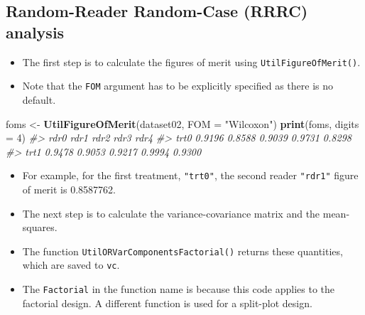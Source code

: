 \documentclass[
]{book}
\newenvironment{Shaded}{\begin{snugshade}}{\end{snugshade}}
\newcommand{\CommentTok}[1]{\textcolor[rgb]{0.56,0.35,0.01}{\textit{#1}}}
\newcommand{\DataTypeTok}[1]{\textcolor[rgb]{0.13,0.29,0.53}{#1}}
\newcommand{\DecValTok}[1]{\textcolor[rgb]{0.00,0.00,0.81}{#1}}
\newcommand{\KeywordTok}[1]{\textcolor[rgb]{0.13,0.29,0.53}{\textbf{#1}}}
\newcommand{\NormalTok}[1]{#1}
\newcommand{\StringTok}[1]{\textcolor[rgb]{0.31,0.60,0.02}{#1}}
\providecommand{\tightlist}{%
  \setlength{\itemsep}{0pt}\setlength{\parskip}{0pt}}
\begin{document}
\hypertarget{or-applications-RRRC-dataset02-hand}{%
\subsection{Random-Reader Random-Case (RRRC) analysis}\label{or-applications-RRRC-dataset02-hand}}

\begin{itemize}
\tightlist
\item
  The first step is to calculate the figures of merit using \texttt{UtilFigureOfMerit()}.
\item
  Note that the \texttt{FOM} argument has to be explicitly specified as there is no default.
\end{itemize}

\begin{Shaded}
\begin{Highlighting}[]
\NormalTok{foms <-}\StringTok{ }\KeywordTok{UtilFigureOfMerit}\NormalTok{(dataset02, }\DataTypeTok{FOM =} \StringTok{"Wilcoxon"}\NormalTok{)}
\KeywordTok{print}\NormalTok{(foms, }\DataTypeTok{digits =} \DecValTok{4}\NormalTok{)}
\CommentTok{#>        rdr0   rdr1   rdr2   rdr3   rdr4}
\CommentTok{#> trt0 0.9196 0.8588 0.9039 0.9731 0.8298}
\CommentTok{#> trt1 0.9478 0.9053 0.9217 0.9994 0.9300}
\end{Highlighting}
\end{Shaded}

\begin{itemize}
\tightlist
\item
  For example, for the first treatment, \texttt{"trt0"}, the second reader \texttt{"rdr1"} figure of merit is 0.8587762.
\item
  The next step is to calculate the variance-covariance matrix and the mean-squares.
\item
  The function \texttt{UtilORVarComponentsFactorial()} returns these quantities, which are saved to \texttt{vc}.
\item
  The \texttt{Factorial} in the function name is because this code applies to the factorial design. A different function is used for a split-plot design.
\end{itemize}
\end{document}
